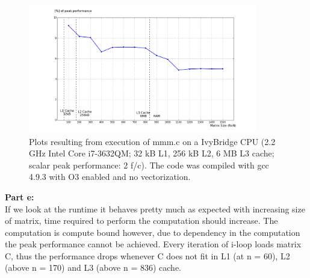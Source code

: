 \documentclass[letterpaper, 11pt]{article}
\begin{document}
\begin{figure}[h!]
    \centering
    \includegraphics[width=100mm]{sol_3_3}
    \caption{Plots resulting from execution of mmm.c on a IvyBridge CPU (2.2 GHz Intel Core i7-3632QM; 32 kB L1, 256 kB L2, 6 MB L3 cache; scalar peak performance: 2 f/c). The code was compiled with gcc 4.9.3 with O3 enabled and no vectorization.}
    \label{fig:percentage}
\end{figure}
\textbf{Part e:} \\
If we look at the runtime it behaves pretty much as expected with increasing size of matrix, time required to perform the computation should increase.
The computation is compute bound however, due to dependency in the computation the peak performance cannot be achieved. Every iteration of i-loop loads matrix C, thus the performance drops whenever C does not fit in L1 (at n = 60), L2 (above n = 170) and L3 (above n = 836) cache.

\bigskip
\end{document}
